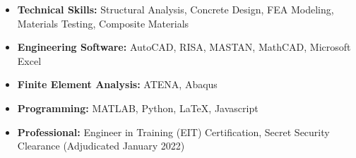 \documentclass[10pt]{article}
\begin{document}
\vspace{.2in}

\begin{itemize}[leftmargin=0.15in, label={}, itemsep=0.1in]
  \item
    \textbf{Technical Skills:}
    Structural Analysis, Concrete Design, FEA Modeling, Materials Testing, Composite Materials

  \item
    \textbf{Engineering Software:}
    AutoCAD, RISA, MASTAN, MathCAD, Microsoft Excel
   \item
    \textbf{Finite Element Analysis:}
    ATENA, Abaqus
  \item
    \textbf{Programming:}
    MATLAB, Python, LaTeX, Javascript

  \item
    \textbf{Professional:}
    Engineer in Training (EIT) Certification, Secret Security Clearance (Adjudicated January 2022)
\end{itemize}
\end{document}
